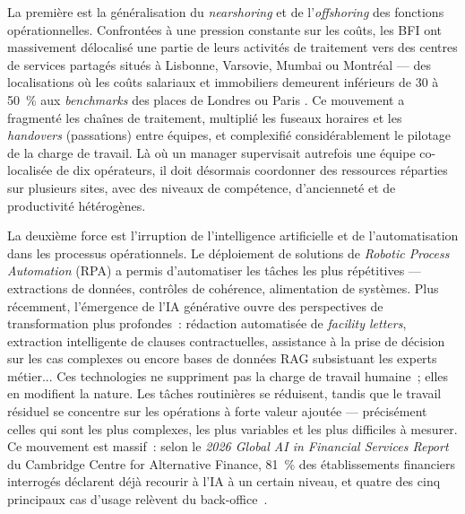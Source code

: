 La première est la généralisation du \textit{nearshoring} et de l'\textit{offshoring} des fonctions opérationnelles. Confrontées à une pression constante sur les coûts, les BFI ont massivement délocalisé une partie de leurs activités de traitement vers des centres de services partagés situés à Lisbonne, Varsovie, Mumbai ou Montréal --- des localisations où les coûts salariaux et immobiliers demeurent inférieurs de 30 à 50~\% aux \textit{benchmarks} des places de Londres ou Paris \cite{hatchworks-nearshore}. Ce mouvement a fragmenté les chaînes de traitement, multiplié les fuseaux horaires et les \textit{handovers} (passations) entre équipes, et complexifié considérablement le pilotage de la charge de travail. Là où un manager supervisait autrefois une équipe co-localisée de dix opérateurs, il doit désormais coordonner des ressources réparties sur plusieurs sites, avec des niveaux de compétence, d'ancienneté et de productivité hétérogènes.

La deuxième force est l'irruption de l'intelligence artificielle et de l'automatisation dans les processus opérationnels. Le déploiement de solutions de \textit{Robotic Process Automation} (RPA) a permis d'automatiser les tâches les plus répétitives --- extractions de données, contrôles de cohérence, alimentation de systèmes. Plus récemment, l'émergence de l'IA générative ouvre des perspectives de transformation plus profondes~: rédaction automatisée de \textit{facility letters}, extraction intelligente de clauses contractuelles, assistance à la prise de décision sur les cas complexes ou encore bases de données RAG subsistuant les experts métier... Ces technologies ne suppriment pas la charge de travail humaine~; elles en modifient la nature. Les tâches routinières se réduisent, tandis que le travail résiduel se concentre sur les opérations à forte valeur ajoutée --- précisément celles qui sont les plus complexes, les plus variables et les plus difficiles à mesurer. Ce mouvement est massif~: selon le \textit{2026 Global AI in Financial
Services Report} du Cambridge Centre for Alternative Finance, 81~\% des
établissements financiers interrogés déclarent déjà recourir à l'IA à un
certain niveau, et quatre des cinq principaux cas d'usage relèvent du
back-office~\cite{ccaf2026}.


